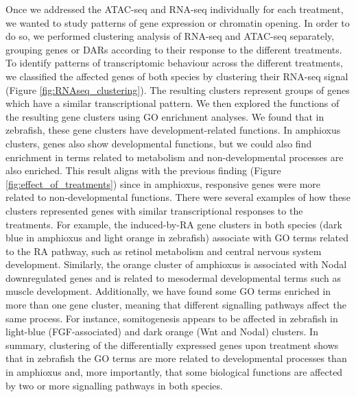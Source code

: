 Once we addressed the ATAC-seq and RNA-seq individually for each treatment, we wanted to study patterns of gene expression or chromatin opening. In order to do so, we performed clustering analysis of RNA-seq and ATAC-seq separately, grouping genes or DARs according to their response to the different treatments. To identify patterns of transcriptomic behaviour across the different treatments, we classified the affected genes of both species by clustering their RNA-seq signal (Figure \ref{fig:RNAseq_clustering}). The resulting clusters represent groups of genes which have a similar transcriptional pattern. We then explored the functions of the resulting gene clusters using GO enrichment analyses. We found that in zebrafish, these gene clusters have development-related functions. In amphioxus clusters, genes also show developmental functions, but we could also find enrichment in terms related to metabolism and non-developmental processes are also enriched. This result aligns with the previous finding (Figure \ref{fig:effect_of_treatments}) since in amphioxus, responsive genes were more related to non-developmental functions. There were several examples of how these clusters represented genes with similar transcriptional responses to the treatments. For example, the induced-by-RA gene clusters in both species (dark blue in amphioxus and light orange in zebrafish) associate with GO terms related to the RA pathway, such as retinol metabolism and central nervous system development. Similarly, the orange cluster of amphioxus is associated with Nodal downregulated genes and is related to mesodermal developmental terms such as muscle development. Additionally, we have found some GO terms enriched in more than one gene cluster, meaning that different signalling pathways affect the same process.  For instance, somitogenesis appears to be affected in zebrafish in light-blue (FGF-associated) and dark orange (Wnt and Nodal) clusters. In summary, clustering of the differentially expressed genes upon treatment shows that in zebrafish the GO terms are more related to developmental processes than in amphioxus and, more importantly, that some biological functions are affected by two or more signalling pathways in both species.



